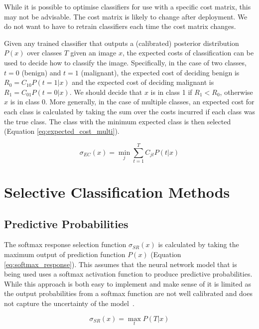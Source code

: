 While it is possible to optimise classifiers for use with a specific cost matrix, this may not be advisable. The cost matrix is likely to change after deployment. We do not want to have to retrain classifiers each time the cost matrix changes.

Given any trained classifier that outputs a (calibrated) posterior distribution $P(x)$ over classes $T$ given an image $x$, the expected costs of classification can be used to decide how to classify the image. Specifically, in the case of two classes, $t=0$ (benign) and $t=1$ (malignant), the expected cost of deciding benign is $R_0 = C_{10} P(t=1|x)$ and the expected cost of deciding malignant is $R_1 = C_{01} P(t=0|x)$. We should decide that $x$ is in class 1 if $R_1 < R_0$, otherwise $x$ is in class 0. More generally, in the case of multiple classes, an expected cost for each class is calculated by taking the sum over the costs incurred if each class was the true class. The class with the minimum expected class is then selected (Equation \ref{eq:expected_cost_multi}).

\begin{equation}
	\sigma_{EC}(x) = \min_{j} \sum_{t=1}^{T} C_{jt} P(t|x)
	\label{eq:expected_cost_multi}
\end{equation}



\section{Selective Classification Methods}
\label{sec:slective_classification_methods}

\subsection{Predictive Probabilities}
\label{subsec:selective_predictive_probabilites}
The softmax response selection function $\sigma_{SR}(x)$ is calculated by taking the maximum output of prediction function $P(x)$ (Equation \ref{eq:softmax_response}). This assumes that the neural network model that is being used uses a softmax activation function to produce predictive probabilities. While this approach is both easy to implement and make sense of it is limited as the output probabilities from a softmax function are not well calibrated and does not capture the uncertainty of the model~\citep{gal2016dropout}.

\begin{equation}
	\sigma_{SR}(x) = \max_{t} P(T|x)
	\label{eq:softmax_response}
\end{equation}

